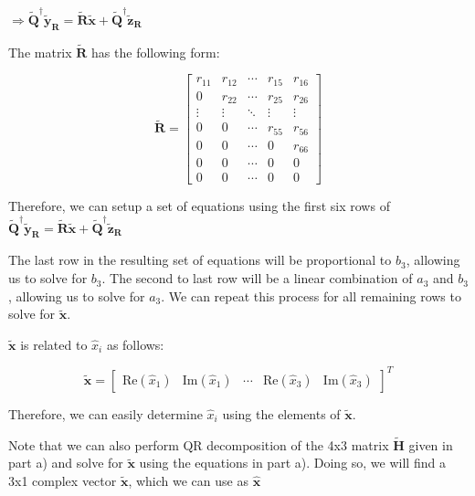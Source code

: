 \documentclass[fleqn]{article}
\begin{document}
\begin{enumerate}
\begin{enumerate}
			$\Rightarrow \mathbf{\tilde{Q}^{\dagger}\tilde{y}_R} = \mathbf{\tilde{R}\tilde{x}} + \mathbf{\tilde{Q}^{\dagger}\tilde{z}_R}$
			
			The matrix $\mathbf{\tilde{R}}$ has the following form:
			
			\begin{equation*}
				\mathbf{\tilde{R}} = \begin{bmatrix}
					r_{11} & r_{12} & \cdots & r_{15} & r_{16} \\
					0 & r_{22} & \cdots & r_{25} & r_{26} \\ 
					\vdots & \vdots & \ddots & \vdots & \vdots \\
					0 & 0 & \cdots & r_{55} & r_{56} \\
					0 & 0 & \cdots & 0 & r_{66} \\
					0 & 0 & \cdots & 0 & 0 \\
					0 & 0 & \cdots & 0 & 0
				\end{bmatrix}
			\end{equation*}
			
			Therefore, we can setup a set of equations using the first six rows of \newline $\mathbf{\tilde{Q}^{\dagger}\tilde{y}_R} = \mathbf{\tilde{R}\tilde{x}} + \mathbf{\tilde{Q}^{\dagger}\tilde{z}_R}$
			
			The last row in the resulting set of equations will be proportional to $b_3$, allowing us to solve for $b_3$. The second to last row will be a linear combination of $a_3$ and $b_3$, allowing us to solve for $a_3$. We can repeat this process for all remaining rows to solve for $\mathbf{\tilde{x}}$.

			$\mathbf{\tilde{x}}$ is related to $\hat{x}_i$ as follows:
		
			\begin{equation*}
				\mathbf{\tilde{x}} = \begin{bmatrix}\text{Re}(\hat{x}_1) & \text{Im}(\hat{x}_1) & \cdots & \text{Re}(\hat{x}_3) & \text{Im}(\hat{x}_3)\end{bmatrix}^T
			\end{equation*}
			
			Therefore, we can easily determine $\hat{x}_i$ using the elements of $\mathbf{\tilde{x}}$.
			
			Note that we can also perform QR decomposition of the 4x3 matrix $\mathbf{\tilde{H}}$ given in part a) and solve for $\mathbf{\tilde{x}}$ using the equations in part a). Doing so, we will find a 3x1 complex vector $\mathbf{\tilde{x}}$, which we can use as $\mathbf{\hat{x}}$
		\end{enumerate}		
	\end{enumerate}
\end{document}
